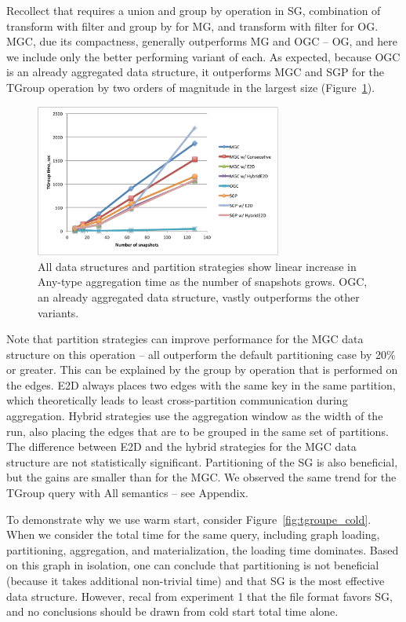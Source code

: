Recollect that  requires a union and group by operation
in SG, combination of transform with filter and group by for MG, and
transform with filter for OG.  MGC, due its compactness, generally
outperforms MG and OGC -- OG, and here we include only the better
performing variant of each.  As expected, because OGC is an already
aggregated data structure, it outperforms MGC and SGP for the TGroup
operation by two orders of magnitude in the largest size
(Figure~\ref{fig:tgroupe}).

\begin{figure}[t!]
\includegraphics[width=3.2in]{figs/tgroupe_warm.pdf}
\caption{All data structures and partition strategies show linear
  increase in Any-type aggregation time as the number of snapshots
  grows.  OGC, an already aggregated data structure, vastly
  outperforms the other variants.}
\label{fig:tgroupe}
\end{figure}

Note that partition strategies can improve performance for the MGC
data structure on this operation -- all outperform the default
partitioning case by 20\% or greater.  This can be explained by the
group by operation that is performed on the edges.  E2D always places
two edges with the same key in the same partition, which theoretically
leads to least cross-partition communication during aggregation.
Hybrid strategies use the aggregation window as the width of the run,
also placing the edges that are to be grouped in the same set of
partitions.  The difference between E2D and the hybrid strategies for
the MGC data structure are not statistically significant.
Partitioning of the SG is also beneficial, but the gains are smaller
than for the MGC.  We observed the same trend for the TGroup query
with All semantics -- see Appendix.

To demonstrate why we use warm start, consider
Figure~\ref{fig:tgroupe_cold}.  When we consider the total time for
the same query, including graph loading, partitioning, aggregation,
and materialization, the loading time dominates.  Based on this graph
in isolation, one can conclude that partitioning is not beneficial
(because it takes additional non-trivial time) and that SG is the most
effective data structure.  However, recal from experiment 1 that the
file format favors SG, and no conclusions should be drawn from cold
start total time alone.

